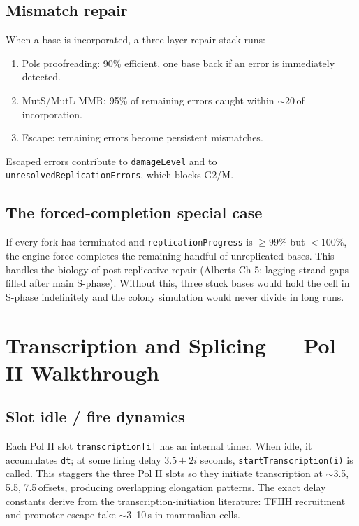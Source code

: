 \documentclass[11pt,letterpaper,twoside,openany]{book}
\newcommand{\code}[1]{\texttt{#1}}
\newcommand{\biosec}{\text{bio-s}}
\begin{document}
\section{Mismatch repair}

When a base is incorporated, a three-layer repair stack runs:
\begin{enumerate}
  \item Pol$\epsilon$ proofreading: 90\% efficient, one base back
        if an error is immediately detected.
  \item MutS/MutL MMR: 95\% of remaining errors caught within
        $\sim$20\,\biosec of incorporation.
  \item Escape: remaining errors become persistent mismatches.
\end{enumerate}
Escaped errors contribute to \code{damageLevel} and to
\code{unresolvedReplicationErrors}, which blocks G2/M.

\section{The forced-completion special case}

If every fork has terminated and \code{replicationProgress} is
$\ge 99\%$ but $< 100\%$, the engine force-completes the remaining
handful of unreplicated bases. This handles the biology of
post-replicative repair (Alberts Ch 5: lagging-strand gaps filled
after main S-phase). Without this, three stuck bases would hold the
cell in S-phase indefinitely and the colony simulation would never
divide in long runs.

\chapter{Transcription and Splicing --- Pol II Walkthrough}
\label{ch:transcription-deep}

\section{Slot idle / fire dynamics}

Each Pol II slot \code{transcription[i]} has an internal timer.
When idle, it accumulates \code{dt}; at some firing delay $3.5 + 2i$
seconds, \code{startTranscription(i)} is called. This staggers
the three Pol II slots so they initiate transcription at
$\sim$3.5, 5.5, 7.5\,\biosec offsets, producing overlapping
elongation patterns. The exact delay constants derive from the
transcription-initiation literature: TFIIH recruitment and promoter
escape take $\sim$3--10\,s in mammalian cells.
\end{document}
